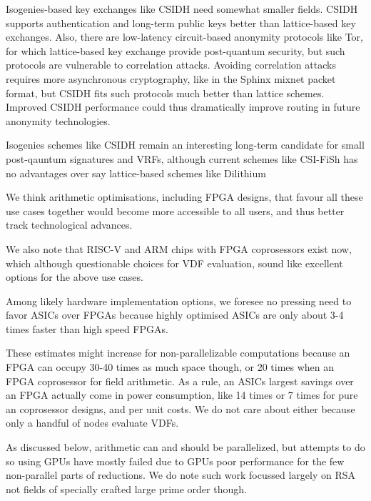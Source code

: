 \documentclass{article}
\begin{document}
Isogenies-based key exchanges like CSIDH \cite{10.1007/978-3-030-03332-3_15} need somewhat
smaller fields.  CSIDH supports authentication and long-term public
keys better than lattice-based key exchanges. 
Also, there are low-latency circuit-based anonymity protocols like Tor,
for which lattice-based key exchange provide post-quantum security,
but such protocols are vulnerable to correlation attacks. 
Avoiding correlation attacks requires more asynchronous cryptography,
like in the Sphinx mixnet packet format, but CSIDH fits such protocols
much better than lattice schemes.  Improved CSIDH performance could
thus dramatically improve routing in future anonymity technologies.

Isogenies schemes like CSIDH remain an interesting long-term candidate
for small post-qauntum signatures and VRFs, although current schemes
like CSI-FiSh \cite{CSI-FiSh} has no advantages over say lattice-based
schemes like Dilithium \cite{Dilithium}

We think arithmetic optimisations, including FPGA designs, that favour
all these use cases together would become more accessible to all users,
and thus better track technological advances.

We also note that RISC-V and ARM chips with FPGA coprosessors exist
now, which although questionable choices for VDF evaluation, sound
like excellent options for the above use cases.

Among likely hardware implementation options, 
we foresee no pressing need to favor ASICs over FPGAs because highly
optimised ASICs are only about 3-4 times faster than high speed FPGAs.

These estimates might increase for non-parallelizable computations
because an FPGA can occupy 30-40 times as much space though, or
20 times when an FPGA coprosessor for field arithmetic.
As a rule, an ASICs largest savings over an FPGA actually come in
power consumption, like 14 times or 7 times for pure an coprosessor
designs, and per unit costs.  We do not care about either
because only a handful of nodes evaluate VDFs.  

As discussed below, arithmetic can and should be parallelized,
but attempts to do so using GPUs have mostly failed due to GPUs poor
performance for the few non-parallel parts of reductions.  
We do note such work focussed largely on RSA not fields of specially
crafted large prime order though.
\end{document}
